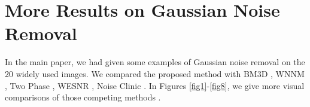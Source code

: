 \documentclass[runningheads]{llncs}
\begin{document}
\section{More Results on Gaussian Noise Removal}
In the main paper, we had given some examples of Gaussian noise removal on the 20 widely used images. We compared the proposed method with BM3D \cite{bm3d}, WNNM \cite{wnnm}, Two Phase \cite{cai2010fast}, WESNR \cite{wesnr}, Noise Clinic \cite{noiseclinic}. In Figures \ref{fig1}-\ref{fig8}, we give more visual comparisons of those competing methods \cite{bm3d,wnnm,cai2010fast,wesnr,noiseclinic}.
\begin{figure}
\centering
{}
\end{figure}
\end{document}
